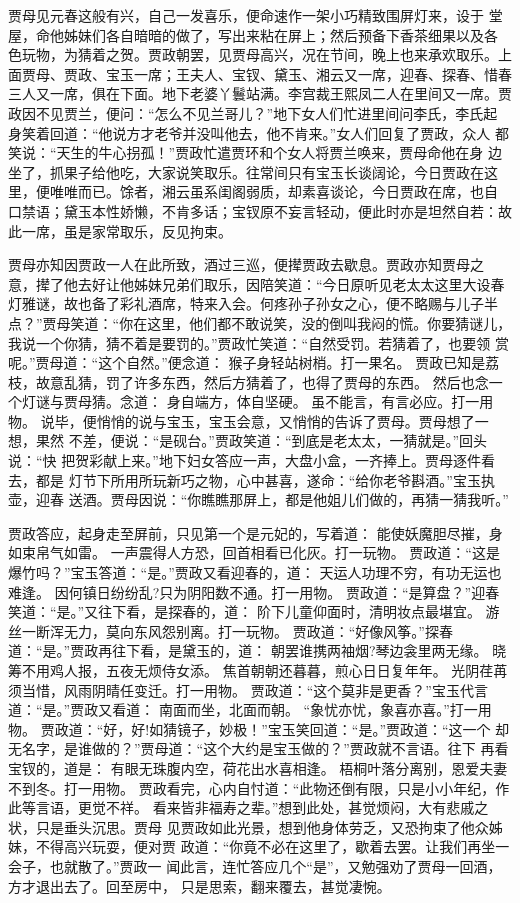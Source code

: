 贾母见元春这般有兴，自己一发喜乐，便命速作一架小巧精致围屏灯来，设于
堂屋，命他姊妹们各自暗暗的做了，写出来粘在屏上；然后预备下香茶细果以及各
色玩物，为猜着之贺。贾政朝罢，见贾母高兴，况在节间，晚上也来承欢取乐。上
面贾母、贾政、宝玉一席；王夫人、宝钗、黛玉、湘云又一席，迎春、探春、惜春
三人又一席，俱在下面。地下老婆丫鬟站满。李宫裁王熙凤二人在里间又一席。贾
政因不见贾兰，便问：“怎么不见兰哥儿？”地下女人们忙进里间问李氏，李氏起
身笑着回道：“他说方才老爷并没叫他去，他不肯来。”女人们回复了贾政，众人
都笑说：“天生的牛心拐孤！”贾政忙遣贾环和个女人将贾兰唤来，贾母命他在身
边坐了，抓果子给他吃，大家说笑取乐。往常间只有宝玉长谈阔论，今日贾政在这
里，便唯唯而已。馀者，湘云虽系闺阁弱质，却素喜谈论，今日贾政在席，也自
口禁语；黛玉本性娇懒，不肯多话；宝钗原不妄言轻动，便此时亦是坦然自若：故
此一席，虽是家常取乐，反见拘束。

贾母亦知因贾政一人在此所致，酒过三巡，便撵贾政去歇息。贾政亦知贾母之
意，撵了他去好让他姊妹兄弟们取乐，因陪笑道：“今日原听见老太太这里大设春
灯雅谜，故也备了彩礼酒席，特来入会。何疼孙子孙女之心，便不略赐与儿子半
点？”贾母笑道：“你在这里，他们都不敢说笑，没的倒叫我闷的慌。你要猜谜儿，
我说一个你猜，猜不着是要罚的。”贾政忙笑道：“自然受罚。若猜着了，也要领
赏呢。”贾母道：“这个自然。”便念道：
猴子身轻站树梢。打一果名。
贾政已知是荔枝，故意乱猜，罚了许多东西，然后方猜着了，也得了贾母的东西。
然后也念一个灯谜与贾母猜。念道：
身自端方，体自坚硬。
虽不能言，有言必应。打一用物。
说毕，便悄悄的说与宝玉，宝玉会意，又悄悄的告诉了贾母。贾母想了一想，果然
不差，便说：“是砚台。”贾政笑道：“到底是老太太，一猜就是。”回头说：“快
把贺彩献上来。”地下妇女答应一声，大盘小盒，一齐捧上。贾母逐件看去，都是
灯节下所用所玩新巧之物，心中甚喜，遂命：“给你老爷斟酒。”宝玉执壶，迎春
送酒。贾母因说：“你瞧瞧那屏上，都是他姐儿们做的，再猜一猜我听。”

贾政答应，起身走至屏前，只见第一个是元妃的，写着道：
能使妖魔胆尽摧，身如束帛气如雷。
一声震得人方恐，回首相看已化灰。打一玩物。
贾政道：“这是爆竹吗？”宝玉答道：“是。”贾政又看迎春的，道：
天运人功理不穷，有功无运也难逢。
因何镇日纷纷乱?只为阴阳数不通。打一用物。
贾政道：“是算盘？”迎春笑道：“是。”又往下看，是探春的，道：
阶下儿童仰面时，清明妆点最堪宜。
游丝一断浑无力，莫向东风怨别离。打一玩物。
贾政道：“好像风筝。”探春道：“是。”贾政再往下看，是黛玉的，道：
朝罢谁携两袖烟?琴边衾里两无缘。
晓筹不用鸡人报，五夜无烦侍女添。
焦首朝朝还暮暮，煎心日日复年年。
光阴荏苒须当惜，风雨阴晴任变迁。打一用物。
贾政道：“这个莫非是更香？”宝玉代言道：“是。”贾政又看道：
南面而坐，北面而朝。
“象忧亦忧，象喜亦喜。”打一用物。
贾政道：“好，好!如猜镜子，妙极！”宝玉笑回道：“是。”贾政道：“这一个
却无名字，是谁做的？”贾母道：“这个大约是宝玉做的？”贾政就不言语。往下
再看宝钗的，道是：
有眼无珠腹内空，荷花出水喜相逢。
梧桐叶落分离别，恩爱夫妻不到冬。打一用物。
贾政看完，心内自忖道：“此物还倒有限，只是小小年纪，作此等言语，更觉不祥。
看来皆非福寿之辈。”想到此处，甚觉烦闷，大有悲戚之状，只是垂头沉思。贾母
见贾政如此光景，想到他身体劳乏，又恐拘束了他众姊妹，不得高兴玩耍，便对贾
政道：“你竟不必在这里了，歇着去罢。让我们再坐一会子，也就散了。”贾政一
闻此言，连忙答应几个“是”，又勉强劝了贾母一回酒，方才退出去了。回至房中，
只是思索，翻来覆去，甚觉凄惋。

